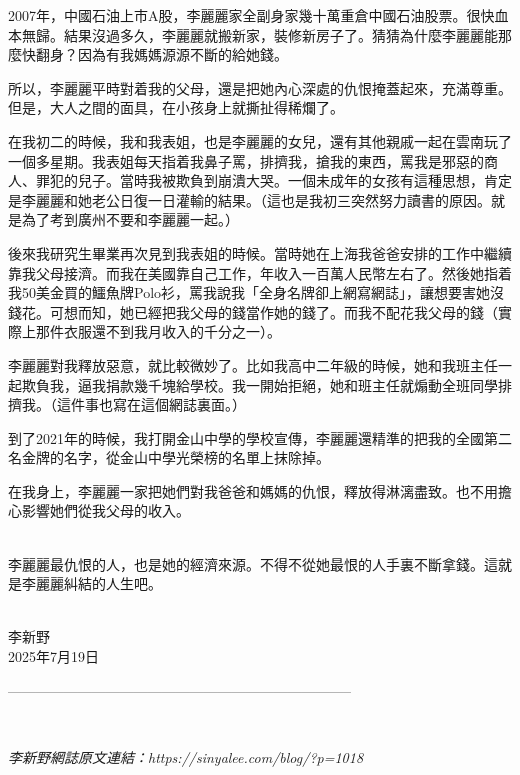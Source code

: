 2007年，中國石油上市A股，李麗麗家全副身家幾十萬重倉中國石油股票。很快血本無歸。結果沒過多久，李麗麗就搬新家，裝修新房子了。猜猜為什麼李麗麗能那麼快翻身？因為有我媽媽源源不斷的給她錢。

所以，李麗麗平時對着我的父母，還是把她內心深處的仇恨掩蓋起來，充滿尊重。但是，大人之間的面具，在小孩身上就撕扯得稀爛了。

在我初二的時候，我和我表姐，也是李麗麗的女兒，還有其他親戚一起在雲南玩了一個多星期。我表姐每天指着我鼻子罵，排擠我，搶我的東西，罵我是邪惡的商人、罪犯的兒子。當時我被欺負到崩潰大哭。一個未成年的女孩有這種思想，肯定是李麗麗和她老公日復一日灌輸的結果。（這也是我初三突然努力讀書的原因。就是為了考到廣州不要和李麗麗一起。）

後來我研究生畢業再次見到我表姐的時候。當時她在上海我爸爸安排的工作中繼續靠我父母接濟。而我在美國靠自己工作，年收入一百萬人民幣左右了。然後她指着我50美金買的鱷魚牌Polo衫，罵我說我「全身名牌卻上網寫網誌」，讓想要害她沒錢花。可想而知，她已經把我父母的錢當作她的錢了。而我不配花我父母的錢（實際上那件衣服還不到我月收入的千分之一）。

李麗麗對我釋放惡意，就比較微妙了。比如我高中二年級的時候，她和我班主任一起欺負我，逼我捐款幾千塊給學校。我一開始拒絕，她和班主任就煽動全班同學排擠我。（這件事也寫在這個網誌裏面。）

到了2021年的時候，我打開金山中學的學校宣傳，李麗麗還精準的把我的全國第二名金牌的名字，從金山中學光榮榜的名單上抹除掉。

在我身上，李麗麗一家把她們對我爸爸和媽媽的仇恨，釋放得淋漓盡致。也不用擔心影響她們從我父母的收入。

\ \\
李麗麗最仇恨的人，也是她的經濟來源。不得不從她最恨的人手裏不斷拿錢。這就是李麗麗糾結的人生吧。

\ \\
李新野\\
2025年7月19日

--------------------------------------------------------------------------

\

\textit{李新野網誌原文連結：https://sinyalee.com/blog/?p=1018}
